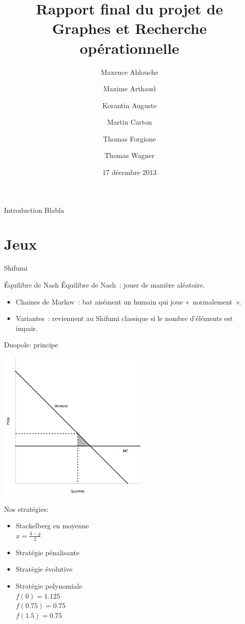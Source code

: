 \documentclass{beamer}
\title[Rapport final de GRO]
      {Rapport final du projet de\\Graphes et Recherche opérationnelle}
\institute{Enseeiht}
\author
  [Ahlouche \and Arthaud \and Auguste
    \and Carton \and Forgione \and Wagner]
  {Maxence Ahlouche \and Maxime Arthaud \and Korantin Auguste
    \and Martin Carton \and Thomas Forgione \and Thomas Wagner}
\date{17 décembre 2013}
\begin{document}
\begin{frame}
  \titlepage
\end{frame}

\begin{frame}{Introduction}
  Blabla
\end{frame}

\section{Jeux}

\begin{frame}{Shifumi}
    \begin{block}{Équilibre de Nash}
        Équilibre de Nash~: jouer de manière aléatoire.
    \end{block}

    \begin{itemize}
        \item Chaines de Markov~: bat aisément un humain qui joue «~normalement~».
        \item Variantes~: reviennent au Shifumi classique si le nombre d'éléments est impair.
    \end{itemize}
\end{frame}

\begin{frame}{Duopole: principe}
  \begin{vwcol}[widths={0.6,0.4}, sep=.0cm, rule=0pt]
    \includegraphics[width=0.55\textwidth]{jeux/duopole_principe}

    Nos stratégies:
    \begin{itemize}
      \item Stackelberg en moyenne \\
      $x=\frac{3-y}{2}$
      \item Stratégie pénalisante
      \item Stratégie évolutive
      \item Stratégie polynomiale \\
      $f(0) = 1.125$ \\
      $f(0.75) = 0.75$ \\
      $f(1.5) = 0.75$ \\
    \end{itemize}
  \end{vwcol}
\end{frame}
\end{document}
